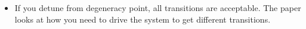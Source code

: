 {\begin{itemize}
                \noindent between  the defined states ,   and the
                odd  interaction   $  \mathcal{H}_I  $  will   evaluate  to  zero
                \textbf{unless the states have opposite parity.}
 	
              \item  If you  detune from  degeneracy point,  all transitions  are
                acceptable. The paper  looks at how you need to  drive the system
                to get different transitions.
              \end{itemize}
            }
